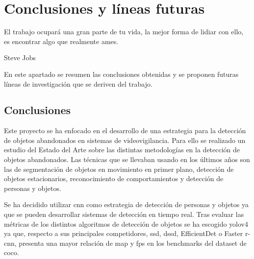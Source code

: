 
\chapter{Conclusiones y líneas futuras}
\label{cha:concl-lineas-futuras}

\begin{FraseCelebre}
  \begin{Frase}
    El trabajo ocupará una gran parte de tu vida, la mejor forma de lidiar con ello, es encontrar algo que realmente ames.
  \end{Frase}
  \begin{Fuente}
    Steve Jobs
  \end{Fuente}
\end{FraseCelebre}

En este apartado se resumen las conclusiones obtenidas y se proponen futuras líneas de investigación
que se deriven del trabajo.

\section{Conclusiones}
\label{sec:conclusiones-finales}

Este proyecto se ha enfocado en el desarrollo de una estrategia para la detección de objetos abandonados en sistemas de videovigilancia. Para ello se realizado un estudio del Estado del Arte sobre las distintas metodologías en la detección de objetos abandonados. Las técnicas que se llevaban usando en los últimos años son las de segmentación de objetos en movimiento en primer plano, detección de objetos estacionarios, reconocimiento de comportamientos y detección de personas y objetos.

Se ha decidido utilizar \gls{cnn} como estrategia de detección de personas y objetos ya que se pueden desarrollar sistemas de detección en tiempo real. Tras evaluar las métricas de los distintos algoritmos de detección de objetos se ha escogido \gls{yolov4} ya que, respecto a sus principales competidores, \gls{ssd}, \gls{dssd}, EfficientDet o Faster \gls{r-cnn}, presenta una mayor relación de \gls{map} y \gls{fps} en los benchmarks del dataset de \gls{coco}.


